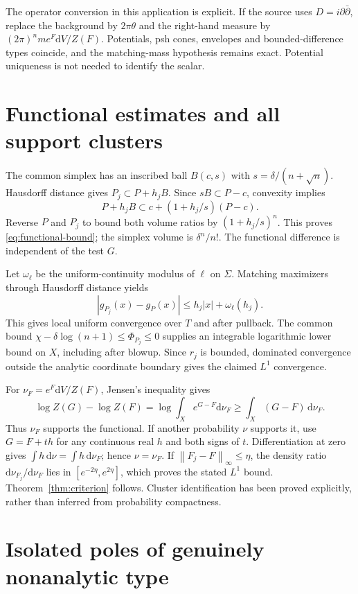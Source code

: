 \documentclass[11pt]{article}
\newcommand{\norm}[1]{\left\|#1\right\|}
\begin{document}
The operator conversion in this application is explicit. If the source
uses $D=i\partial\bar\partial$, replace the background by $2\pi\theta$
and the right-hand measure by $(2\pi)^n m e^F\mathrm dV/Z(F)$.
Potentials, psh cones, envelopes and bounded-difference types coincide,
and the matching-mass hypothesis remains exact. Potential uniqueness
is not needed to identify the scalar.

\section{Functional estimates and all support clusters}

The common simplex has an inscribed ball $B(c,s)$ with
$s=\delta/(n+\sqrt n)$. Hausdorff distance gives
$P_j\subset P+h_jB$. Since $sB\subset P-c$, convexity implies
\[
 P+h_jB\subset c+(1+h_j/s)(P-c).
\]
Reverse $P$ and $P_j$ to bound both volume ratios by $(1+h_j/s)^n$.
This proves \eqref{eq:functional-bound}; the simplex volume is
$\delta^n/n!$. The functional difference is independent of the test $G$.

Let $\omega_\ell$ be the uniform-continuity modulus of $\ell$ on $\Sigma$.
Matching maximizers through Hausdorff distance yields
\[
 |g_{P_j}(x)-g_P(x)|\le h_j|x|+\omega_\ell(h_j).
\]
This gives local uniform convergence over $T$ and after pullback.
The common bound $\chi-\delta\log(n+1)\le\Phi_{P_j}\le0$ supplies
an integrable logarithmic lower bound on $X$, including after blowup.
Since $r_j$ is bounded, dominated convergence outside the analytic
coordinate boundary gives the claimed $L^1$ convergence.

For $\nu_F=e^F\mathrm dV/Z(F)$, Jensen's inequality gives
\[
 \log Z(G)-\log Z(F)=\log\int_Xe^{G-F}\mathrm d\nu_F
                \ge\int_X(G-F)\,\mathrm d\nu_F.
\]
Thus $\nu_F$ supports the functional. If another probability $\nu$
supports it, use $G=F+th$ for any continuous real $h$ and both signs
of $t$. Differentiation at zero gives
$\int h\,\mathrm d\nu=\int h\,\mathrm d\nu_F$; hence $\nu=\nu_F$.
If $\norm{F_j-F}_\infty\le\eta$, the density ratio
$\mathrm d\nu_{F_j}/\mathrm d\nu_F$ lies in
$[e^{-2\eta},e^{2\eta}]$, which proves the stated $L^1$ bound.
Theorem~\ref{thm:criterion} follows. Cluster identification has been
proved explicitly, rather than inferred from probability compactness.

\section{Isolated poles of genuinely nonanalytic type}
\end{document}
